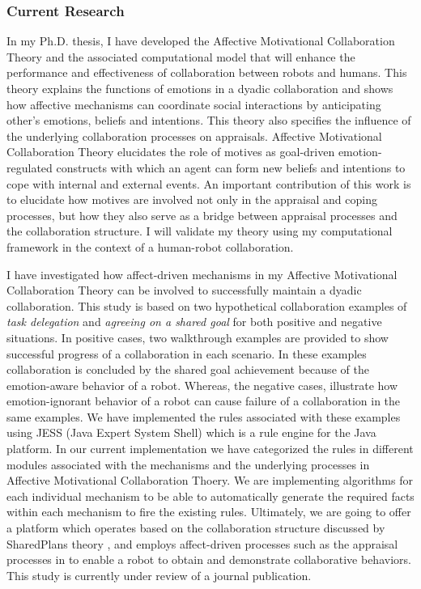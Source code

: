 \documentclass[a4paper, 10pt]{article}
\begin{document}
\begin{small}
\subsubsection*{Current Research}

In my Ph.D. thesis, I have developed the Affective Motivational Collaboration
Theory and the associated computational model that will enhance the performance
and effectiveness of collaboration between robots and humans. This theory
explains the functions of emotions in a dyadic collaboration and shows how
affective mechanisms can coordinate social interactions by anticipating other's
emotions, beliefs and intentions. This theory also specifies the influence of
the underlying collaboration processes on appraisals. Affective Motivational
Collaboration Theory elucidates the role of motives as goal-driven
emotion-regulated constructs with which an agent can form new beliefs and
intentions to cope with internal and external events. An important contribution
of this work is to elucidate how motives are involved not only in the appraisal
and coping processes, but how they also serve as a bridge between appraisal
processes and the collaboration structure. I will validate my theory using my
computational framework in the context of a human-robot collaboration.

I have investigated how affect-driven mechanisms in my Affective Motivational
Collaboration Theory can be involved to successfully maintain a dyadic
collaboration. This study is based on two hypothetical collaboration examples of
\textit{task delegation} and \textit{agreeing on a shared goal} for both
positive and negative situations. In positive cases, two walkthrough examples
are provided to show successful progress of a collaboration in each scenario. In
these examples collaboration is concluded by the shared goal achievement because
of the emotion-aware behavior of a robot. Whereas, the negative cases,
illustrate how emotion-ignorant behavior of a robot can cause failure of a
collaboration in the same examples. We have implemented the rules associated
with these examples using JESS (Java Expert System Shell) which is a rule engine
for the Java platform. In our current implementation we have categorized the
rules in different modules associated with the mechanisms and the underlying
processes in Affective Motivational Collaboration Thoery. We are implementing
algorithms for each individual mechanism to be able to automatically generate
the required facts within each mechanism to fire the existing rules. Ultimately,
we are going to offer a platform which operates based on the collaboration
structure discussed by SharedPlans theory \cite{grosz:discourse-structure}, and
employs affect-driven processes such as the appraisal processes in
\cite{marsella:ema-process-model} to enable a robot to obtain and demonstrate
collaborative behaviors. This study is currently under review of a
journal publication. 


\end{small}
\end{document}
